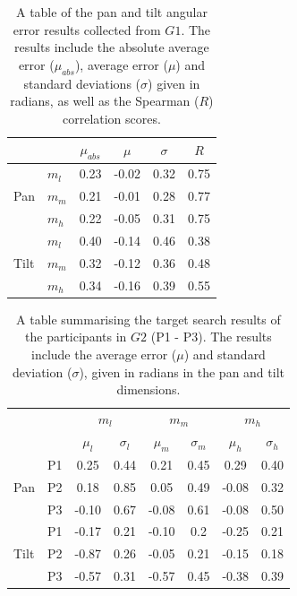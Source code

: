 \documentclass[sigconf, screen=true, anonymous=true]{acmart}
\begin{document}
\begin{table}
  \centering
  \caption{A table of the pan and tilt angular error results collected from $G1$. The results include the absolute average error ($\mu_{abs}$), average error ($\mu$) and standard deviations ($\sigma$) given in radians, as well as the Spearman ($R$) correlation scores.}\label{tab:results}
  \begin{tabular}{llcccc}
    \toprule
    \multicolumn{2}{c}{} & $\mu_{abs}$ & $\mu$ & $\sigma$ & $R$ \\\midrule
         & $m_l$ & 0.23 & -0.02 & 0.32 & 0.75 \\%
    Pan  & $m_m$ & 0.21 & -0.01 & 0.28 & 0.77 \\%
         & $m_h$ & 0.22 & -0.05 & 0.31 & 0.75 \\\midrule
         & $m_l$ & 0.40 & -0.14 & 0.46 & 0.38 \\%
    Tilt & $m_m$ & 0.32 & -0.12 & 0.36 & 0.48 \\%
         & $m_h$ & 0.34 & -0.16 & 0.39 & 0.55 \\
    \bottomrule
  \end{tabular}
\end{table}

\begin{table}
  \centering
  \caption{A table summarising the target search results of the participants in $G2$ (P1 - P3). The results include the average error ($\mu$) and standard deviation ($\sigma$), given in radians in the pan and tilt dimensions.}\label{tab:vi-results}
  \begin{tabular}{llcccccc}
    \toprule
    \multicolumn{2}{c}{} & \multicolumn{2}{c}{$m_l$} & \multicolumn{2}{c}{$m_m$} & \multicolumn{2}{c}{$m_h$} \\
    \multicolumn{2}{c}{} & $\mu_l$ & $\sigma_l$ & $\mu_m$ & $\sigma_m$ & $\mu_h$ & $\sigma_h$ \\\midrule
	 & P1 &  0.25 & 0.44 &  0.21 & 0.45 &  0.29 & 0.40 \\%
    Pan  & P2 &  0.18 & 0.85 &  0.05 & 0.49 & -0.08 & 0.32 \\%
	 & P3 & -0.10 & 0.67 & -0.08 & 0.61 & -0.08 & 0.50 \\ \midrule
	 & P1 & -0.17 & 0.21 & -0.10 & 0.2  & -0.25 & 0.21 \\%
    Tilt & P2 & -0.87 & 0.26 & -0.05 & 0.21 & -0.15 & 0.18 \\%
	 & P3 & -0.57 & 0.31 & -0.57 & 0.45 & -0.38 & 0.39 \\%
    \bottomrule
  \end{tabular}
\end{table}
\end{document}
